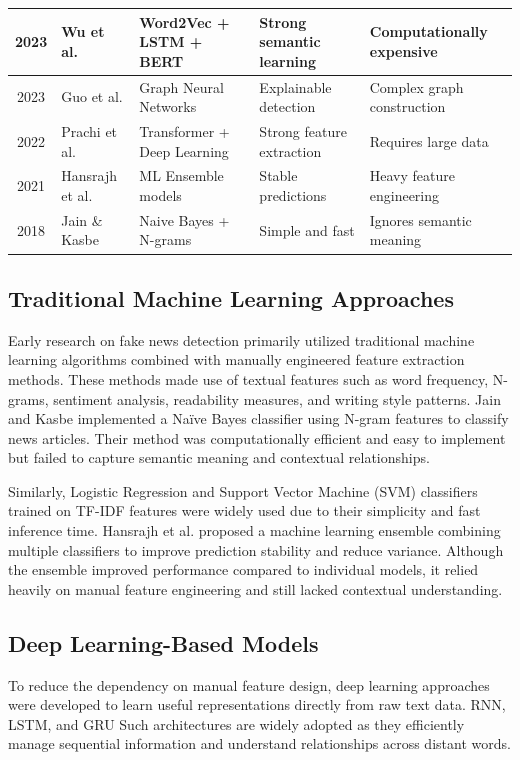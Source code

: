 \documentclass[conference]{IEEEtran}
\begin{document}
\begin{table}[H]
\begin{tabular}{|c|l|p{4cm}|p{3cm}|p{4cm}|}
2023 & Wu et al. & Word2Vec + LSTM + BERT & Strong semantic learning & Computationally expensive \\
\hline
2023 & Guo et al. & Graph Neural Networks & Explainable detection & Complex graph construction \\
\hline
2022 & Prachi et al. & Transformer + Deep Learning & Strong feature extraction & Requires large data \\
\hline
2021 & Hansrajh et al. & ML Ensemble models & Stable predictions & Heavy feature engineering \\
\hline
2018 & Jain \& Kasbe & Naive Bayes + N-grams & Simple and fast & Ignores semantic meaning \\
\hline
\end{tabular}
\end{table}

\subsection{Traditional Machine Learning Approaches}
Early research on fake news detection primarily utilized traditional machine learning algorithms combined with manually engineered feature extraction methods. These methods made use of textual features such as word frequency, N-grams, sentiment analysis, readability measures, and writing style patterns. Jain and Kasbe \cite{jain2018} implemented a Naïve Bayes classifier using N-gram features to classify news articles. Their method was computationally efficient and easy to implement but failed to capture semantic meaning and contextual relationships.

Similarly, Logistic Regression and Support Vector Machine (SVM) classifiers trained on TF-IDF features were widely used due to their simplicity and fast inference time. Hansrajh et al. \cite{hansrajh2021} proposed a machine learning ensemble combining multiple classifiers to improve prediction stability and reduce variance. Although the ensemble improved performance compared to individual models, it relied heavily on manual feature engineering and still lacked contextual understanding.

\subsection{Deep Learning-Based Models}
To reduce the dependency on manual feature design, deep learning approaches were developed to learn useful representations directly from raw text data. RNN, LSTM, and GRU Such architectures are widely adopted as they efficiently manage sequential information and understand relationships across distant words.
\end{document}

